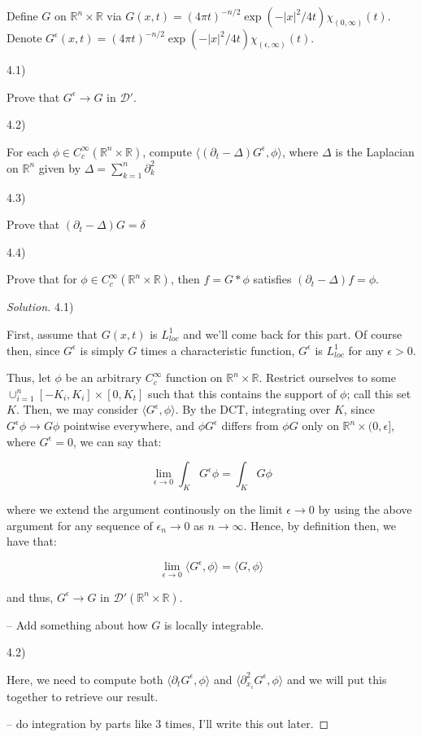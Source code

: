 \documentclass[10pt]{article}
\newenvironment{problem}[2][]{\begin{trivlist}
\item[\hskip \labelsep {\bfseries #1}\hskip \labelsep {\bfseries #2.}]}{\end{trivlist}}
\begin{document}
\begin{problem}{Question 4}

Define $G$ on $\mathbb{R}^n \times \mathbb{R}$ via $G(x,t) = (4\pi t)^{-n/2} \exp(-|x|^2/4t) \chi_{(0,\infty)}(t)$. Denote $G^\epsilon(x,t) = (4\pi t)^{-n/2} \exp(-|x|^2/4t) \chi_{(\epsilon,\infty)}(t)$.

4.1)

Prove that $G^\epsilon \to G$ in $\mathcal{D}'$.

4.2)

For each $\phi \in C^\infty_c(\mathbb{R}^n \times \mathbb{R})$, compute $\langle (\partial_t - \Delta) G^\epsilon, \phi \rangle$, where $\Delta$ is the Laplacian on $\mathbb{R}^n$ given by $\Delta = \sum_{k=1}^n \partial^2_k$

4.3)

Prove that $(\partial_t - \Delta)G = \delta$

4.4)

Prove that for $\phi \in C^\infty_c(\mathbb{R}^n \times \mathbb{R})$, then $f = G \ast \phi$ satisfies $(\partial_t - \Delta)f = \phi$.

\end{problem}

\begin{proof}[Solution]

4.1)

First, assume that $G(x,t)$ is $L^1_{loc}$ and we'll come back for this part. Of course then, since $G^\epsilon$ is simply $G$ times a characteristic function, $G^\epsilon$ is $L^1_{loc}$ for any $\epsilon > 0$.

Thus, let $\phi$ be an arbitrary $C^\infty_c$ function on $\mathbb{R}^n \times \mathbb{R}$. Restrict ourselves to some $\cup_{i=1}^n [-K_i, K_i] \times [0, K_t]$ such that this contains the support of $\phi$; call this set $K$. Then, we may consider $\langle G^\epsilon, \phi \rangle$. By the DCT, integrating over $K$, since $G^\epsilon \phi \to G \phi$ pointwise everywhere, and $\phi G^\epsilon$ differs from $\phi G$ only on $\mathbb{R}^n \times (0, \epsilon]$, where $G^\epsilon = 0$, we can say that:

$$ \lim_{\epsilon \to 0} \int_K G^\epsilon \phi = \int_K G \phi $$

where we extend the argument continously on the limit $\epsilon \to 0$ by using the above argument for any sequence of $\epsilon_n \to 0$ as $n \to \infty$. Hence, by definition then, we have that:

$$ \lim_{\epsilon \to 0} \langle G^\epsilon, \phi \rangle = \langle G, \phi \rangle $$

and thus, $G^\epsilon \to G$ in $\mathcal{D}'(\mathbb{R}^n \times \mathbb{R})$.

-- Add something about how $G$ is locally integrable.

4.2)

Here, we need to compute both $\langle \partial_t G^\epsilon, \phi \rangle$ and $\langle \partial_{x_i}^2 G^\epsilon, \phi \rangle$ and we will put this together to retrieve our result.

-- do integration by parts like 3 times, I'll write this out later.

\end{proof}
\end{document}
